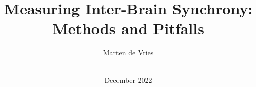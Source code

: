 \documentclass[man,floatsintext,biblatex,a4paper]{apa7}
\title{Measuring Inter-Brain Synchrony: Methods and Pitfalls}
\author{Marten de Vries\\~}
\date{December 2022}
\begin{document}
\maketitle
\tableofcontents\newpage










\nocite{de_vries_marten--vriesmeasuring-inter-brain-synchrony_2022}
\printbibliography
\end{document}
